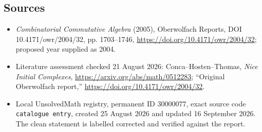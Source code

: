 \documentclass[11pt]{article}
\begin{document}
\subsection{Sources}
\begin{itemize}
\item \emph{Combinatorial Commutative Algebra} (2005), Oberwolfach Reports, DOI 10.4171/owr/2004/32, pp. 1703--1746, \url{https://doi.org/10.4171/owr/2004/32}; proposed year supplied as 2004.
\item Literature assessment checked 21 August 2026: Conca--Hosten--Thomas, \emph{Nice Initial Complexes}, \url{https://arxiv.org/abs/math/0512283}; ``Original Oberwolfach report,'' \url{https://doi.org/10.4171/owr/2004/32}.
\item Local UnsolvedMath registry, permanent ID $30000077$, exact source code \texttt{catalogue entry}, created 25 August 2026 and updated 16 September 2026. The clean statement is labelled corrected and verified against the report.
\end{itemize}
\end{document}
